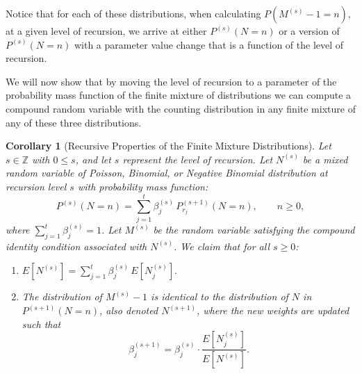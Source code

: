 \documentclass[11pt]{amsart}
\theoremstyle{definition}
\theoremstyle{plain}
\newtheorem{corollary}{Corollary}
\begin{document}
Notice that for each of these distributions, when calculating $P(M^{(s)} - 1 = n)$, at a
given level of recursion, we arrive at either $P^{(s)}(N = n)$ or a version of
$P^{(s)}(N = n)$ with a parameter value change that is a function of the level of
recursion.

We will now show that by moving the level of recursion to a parameter of the probability
mass function of the finite mixture of distributions we can compute a compound random
variable with the counting distribution in any finite mixture of any of these three
distributions.

\begin{corollary}[Recursive Properties of the Finite Mixture Distributions]
\label{cor:general}
Let $s \in \mathbb{Z}$ with $0 \leq s$, and let $s$ represent the level of recursion.
Let $N^{(s)}$ be a mixed random variable of Poisson, Binomial, or Negative Binomial
distribution at recursion level $s$ with probability mass function:
\[
    P^{(s)}(N = n) = \sum_{j=1}^{t} \beta_j^{(s)}\, P_{r_j}^{(s+1)}(N = n), \qquad n \geq 0,
\]
where $\sum_{j=1}^{t}\beta_j^{(s)} = 1$.  Let $M^{(s)}$ be the random variable satisfying the
compound identity condition associated with $N^{(s)}$.  We claim that for all $s \geq 0$:
\begin{enumerate}
\item $E[N^{(s)}] = \displaystyle\sum_{j=1}^{t} \beta_j^{(s)}\, E[N_j^{(s)}].$
\item The distribution of $M^{(s)} - 1$ is identical to the distribution of $N$ in $P^{(s+1)}(N=n)$, also denoted $N^{(s+1)}$,
      where the new weights are updated such that
      \[
          \beta_j^{(s+1)} = \beta_j^{(s)} \cdot
          \frac{E[N_j^{(s)}]}{E[N^{(s)}]}.
      \]
\end{enumerate}
\end{corollary}
\end{document}

